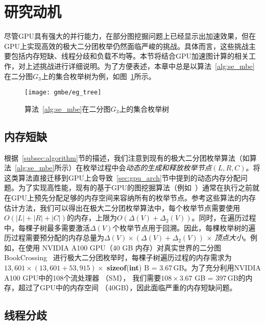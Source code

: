 \section{研究动机}

尽管GPU具有强大的并行能力，在部分图挖掘问题上已经显示出加速效果，但在GPU上实现高效的极大二分团枚举仍然面临严峻的挑战。具体而言，这些挑战主要包括内存短缺、线程分歧和负载不均等。本节将结合GPU加速图计算的相关工作，对上述挑战进行详细说明。为了方便表述，本章中总是以算法~\ref{alg:se_mbe} 在二分图$G_3$上的集合枚举树为例，如图~\ref{fig:gmbe_tree}所示。

\begin{figure} [H]
	\centering
  \vspace{0.1in}
	\texttt{[image: gmbe/eg\_tree]}
  \vspace{0.1in}
	\caption{算法~\ref{alg:se_mbe}在二分图$G_3$上的集合枚举树}

	\label{fig:gmbe_tree}
\end{figure}

\subsection{内存短缺}
根据~\ref{subsec:algorithm}节的描述，我们注意到现有的极大二分团枚举算法（如算法~\ref{alg:se_mbe}所示）在枚举过程中会\emph{动态的生成和释放枚举节点$(L,R,C)$}。将这类算法直接迁移到GPU上会导致~\ref{sec:gpu_arch}节中提到的动态内存分配问题。为了实现高性能，现有的基于GPU的图挖掘算法（例如~\cite{MCE-GPU21,Kclique22,g2miner22,Graphset23}）通常在执行之前就在GPU上预先分配足够的内存空间来容纳所有的枚举节点。参考这些算法的内存估计方法，我们可以得出在极大二分团枚举算法中，每个枚举节点需要使用$O(|L|+|R|+|C|)$的内存，上限为$O(\Delta(V) + \Delta_2(V))$。同时，在遍历过程中，每棵子树最多需要激活$\Delta(V)$个枚举节点用于回溯。因此，每棵枚举树的遍历过程需要预分配的内存总量为$\Delta(V) \times (\Delta(V) + \Delta_2(V))$ $\times$ \textit{顶点大小}。例如，在使用 NVIDIA A100 GPU（40 GB 内存）对真实世界的二分图 BookCrossing~\cite{konect} 进行极大二分团枚举时，每棵子树遍历过程的内存需求为$13,601 \times (13,601 + 53,915) \times$ \textbf{sizeof}(\textbf{int}) B = 3.67\,GB。为了充分利用NVIDIA A100 GPU中的108个流处理器 （SM）， 我们需要$108 \times 3.67$ GB = 397\,GB的内存，超过了GPU中的内存空间 （40GB），因此面临严重的内存短缺问题。

\subsection{线程分歧}
\label{subsec:gmbe_thread_divergence}

